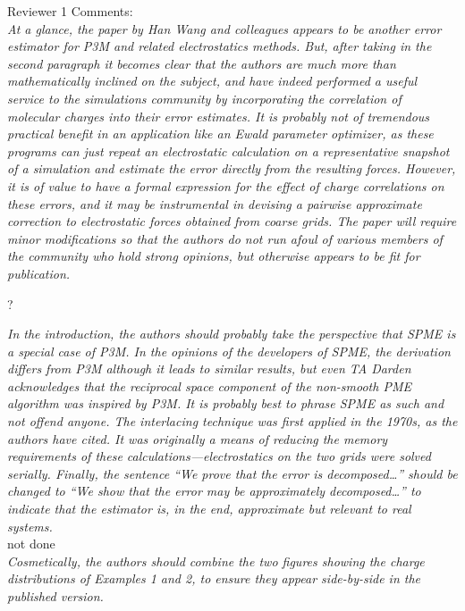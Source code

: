 \documentclass[a4paper]{article}
\begin{document}
\noindent
Reviewer  1 Comments:\\

\textit{ At a glance, the paper by Han Wang and colleagues appears to
  be another error estimator for P3M and related electrostatics
  methods.  But, after taking in the second paragraph it becomes clear
  that the authors are much more than mathematically inclined on the
  subject, and have indeed performed a useful service to the
  simulations community by incorporating the correlation of molecular
  charges into their error estimates.  It is probably not of
  tremendous practical benefit in an application like an Ewald
  parameter optimizer, as these programs can just repeat an
  electrostatic calculation on a representative snapshot of a
  simulation and estimate the error directly from the resulting
  forces.  However, it is of value to have a formal expression for the
  effect of charge correlations on these errors, and it may be
  instrumental in devising a pairwise approximate correction to
  electrostatic forces obtained from coarse grids.  The paper will
  require minor modifications so that the authors do not run afoul of
  various members of the community who hold strong opinions, but
  otherwise appears to be fit for publication.
}

?

\textit{
In the introduction, the authors should probably take the perspective that SPME is a special case of P3M.  In the opinions of the developers of SPME, the derivation differs from P3M although it leads to similar results, but even TA Darden acknowledges that the reciprocal space component of the non-smooth PME algorithm was inspired by P3M.  It is probably best to phrase SPME as such and not offend anyone.  The interlacing technique was first applied in the 1970s, as the authors have cited.  It was originally a means of reducing the memory requirements of these calculations—electrostatics on the two grids were solved serially.  Finally, the sentence “We prove that the error is decomposed…” should be changed to “We show that the error may be approximately decomposed…” to indicate that the estimator is, in the end, approximate but relevant to real systems.
}\\

not done\\

\textit{ Cosmetically, the authors should combine the two figures
  showing the charge distributions of Examples 1 and 2, to ensure they
  appear side-by-side in the published version.
}
\end{document}
